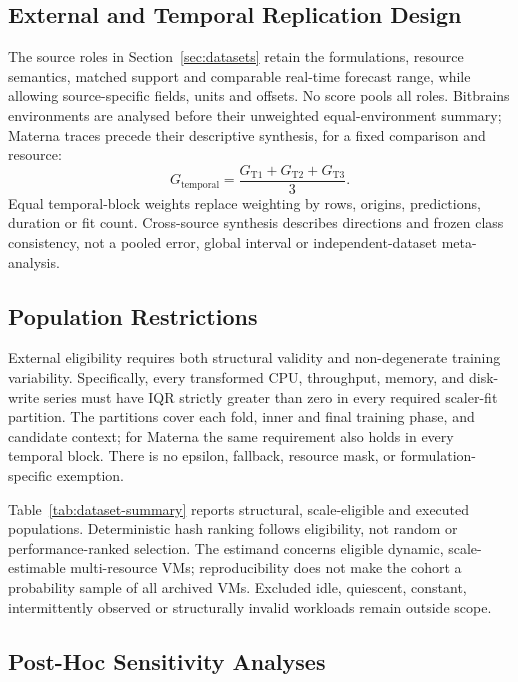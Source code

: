 \documentclass[a4paper,fleqn]{cas-dc}
\begin{document}
\subsection{External and Temporal Replication Design}
\label{sec:replication-design}

The source roles in Section~\ref{sec:datasets} retain the formulations,
resource semantics, matched support and comparable real-time forecast range,
while allowing source-specific fields, units and offsets. No score pools all
roles. Bitbrains environments are analysed before their unweighted
equal-environment summary; Materna traces precede their descriptive synthesis,
for a fixed comparison and resource:
\begin{equation}
  G_{\mathrm{temporal}}
  = \frac{G_{\mathrm{T1}}+G_{\mathrm{T2}}+G_{\mathrm{T3}}}{3}.
  \label{eq:temporal-synthesis}
\end{equation}
Equal temporal-block weights replace weighting by rows, origins, predictions,
duration or fit count. Cross-source synthesis describes directions and frozen
class consistency, not a pooled error, global interval or independent-dataset
meta-analysis.

\subsection{Population Restrictions}
\label{sec:population-restrictions}

External eligibility requires both structural validity and non-degenerate
training variability.  Specifically, every transformed CPU, throughput,
memory, and disk-write series must have IQR strictly greater than zero in every
required scaler-fit partition.  The partitions cover each fold, inner and final
training phase, and candidate context; for Materna the same requirement also
holds in every temporal block.  There is no epsilon, fallback, resource mask,
or formulation-specific exemption.

Table~\ref{tab:dataset-summary} reports structural, scale-eligible and executed
populations. Deterministic hash ranking follows eligibility, not random or
performance-ranked selection. The estimand concerns eligible dynamic,
scale-estimable multi-resource VMs; reproducibility does not make the cohort
a probability sample of all archived VMs. Excluded idle, quiescent, constant,
intermittently observed or structurally invalid workloads remain outside scope.

\subsection{Post-Hoc Sensitivity Analyses}
\label{sec:posthoc-controls}
\end{document}
